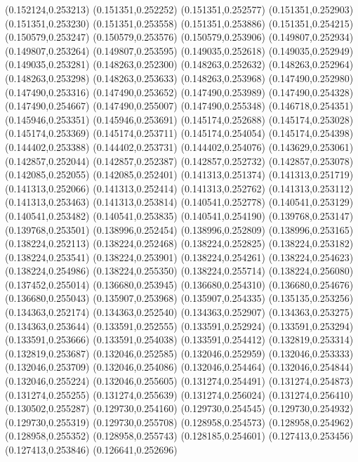 (0.152124,0.253213)
(0.151351,0.252252)
(0.151351,0.252577)
(0.151351,0.252903)
(0.151351,0.253230)
(0.151351,0.253558)
(0.151351,0.253886)
(0.151351,0.254215)
(0.150579,0.253247)
(0.150579,0.253576)
(0.150579,0.253906)
(0.149807,0.252934)
(0.149807,0.253264)
(0.149807,0.253595)
(0.149035,0.252618)
(0.149035,0.252949)
(0.149035,0.253281)
(0.148263,0.252300)
(0.148263,0.252632)
(0.148263,0.252964)
(0.148263,0.253298)
(0.148263,0.253633)
(0.148263,0.253968)
(0.147490,0.252980)
(0.147490,0.253316)
(0.147490,0.253652)
(0.147490,0.253989)
(0.147490,0.254328)
(0.147490,0.254667)
(0.147490,0.255007)
(0.147490,0.255348)
(0.146718,0.254351)
(0.145946,0.253351)
(0.145946,0.253691)
(0.145174,0.252688)
(0.145174,0.253028)
(0.145174,0.253369)
(0.145174,0.253711)
(0.145174,0.254054)
(0.145174,0.254398)
(0.144402,0.253388)
(0.144402,0.253731)
(0.144402,0.254076)
(0.143629,0.253061)
(0.142857,0.252044)
(0.142857,0.252387)
(0.142857,0.252732)
(0.142857,0.253078)
(0.142085,0.252055)
(0.142085,0.252401)
(0.141313,0.251374)
(0.141313,0.251719)
(0.141313,0.252066)
(0.141313,0.252414)
(0.141313,0.252762)
(0.141313,0.253112)
(0.141313,0.253463)
(0.141313,0.253814)
(0.140541,0.252778)
(0.140541,0.253129)
(0.140541,0.253482)
(0.140541,0.253835)
(0.140541,0.254190)
(0.139768,0.253147)
(0.139768,0.253501)
(0.138996,0.252454)
(0.138996,0.252809)
(0.138996,0.253165)
(0.138224,0.252113)
(0.138224,0.252468)
(0.138224,0.252825)
(0.138224,0.253182)
(0.138224,0.253541)
(0.138224,0.253901)
(0.138224,0.254261)
(0.138224,0.254623)
(0.138224,0.254986)
(0.138224,0.255350)
(0.138224,0.255714)
(0.138224,0.256080)
(0.137452,0.255014)
(0.136680,0.253945)
(0.136680,0.254310)
(0.136680,0.254676)
(0.136680,0.255043)
(0.135907,0.253968)
(0.135907,0.254335)
(0.135135,0.253256)
(0.134363,0.252174)
(0.134363,0.252540)
(0.134363,0.252907)
(0.134363,0.253275)
(0.134363,0.253644)
(0.133591,0.252555)
(0.133591,0.252924)
(0.133591,0.253294)
(0.133591,0.253666)
(0.133591,0.254038)
(0.133591,0.254412)
(0.132819,0.253314)
(0.132819,0.253687)
(0.132046,0.252585)
(0.132046,0.252959)
(0.132046,0.253333)
(0.132046,0.253709)
(0.132046,0.254086)
(0.132046,0.254464)
(0.132046,0.254844)
(0.132046,0.255224)
(0.132046,0.255605)
(0.131274,0.254491)
(0.131274,0.254873)
(0.131274,0.255255)
(0.131274,0.255639)
(0.131274,0.256024)
(0.131274,0.256410)
(0.130502,0.255287)
(0.129730,0.254160)
(0.129730,0.254545)
(0.129730,0.254932)
(0.129730,0.255319)
(0.129730,0.255708)
(0.128958,0.254573)
(0.128958,0.254962)
(0.128958,0.255352)
(0.128958,0.255743)
(0.128185,0.254601)
(0.127413,0.253456)
(0.127413,0.253846)
(0.126641,0.252696)
